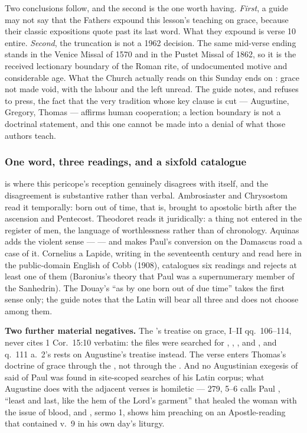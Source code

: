 Two conclusions follow, and the second is the one worth having. \textit{First},
a guide may not say that the Fathers expound this lesson's teaching on grace,
because their classic expositions quote past its last word. What they expound
is verse 10 entire. \textit{Second}, the truncation is not a 1962 decision.
The same mid-verse ending stands in the Venice Missal of 1570 and in the Pustet
Missal of 1862, so it is the received lectionary boundary of the Roman rite, of
undocumented motive and considerable age. What the Church actually reads on
this Sunday ends on : grace not made void,
with the labour and the  left unread. The guide notes, and refuses
to press, the fact that the very tradition whose key clause is cut ---
Augustine, Gregory, Thomas --- affirms human cooperation; a lection boundary is
not a doctrinal statement, and this one cannot be made into a denial of what
those authors teach.

\subsubsection*{One word, three readings, and a sixfold catalogue}

 is where this pericope's reception genuinely
disagrees with itself, and the disagreement is substantive rather than verbal.
Ambrosiaster and Chrysostom read it temporally: born out of time, that is,
brought to apostolic birth after the ascension and Pentecost. Theodoret reads
it juridically: a thing not entered in the register of men, the language of
worthlessness rather than of chronology. Aquinas adds the violent sense ---
 --- and makes Paul's conversion on the Damascus
road a case of it. Cornelius a Lapide, writing in the seventeenth century and
read here in the public-domain English of Cobb (1908), catalogues six readings
and rejects at least one of them (Baronius's theory that Paul was a
supernumerary member of the Sanhedrin). The Douay's ``as by one born out of due
time'' takes the first sense only; the guide notes that the Latin will bear all
three and does not choose among them.

\textbf{Two further material negatives.} The 's treatise
on grace, I--II qq.~106--114, never cites 1 Cor.~15:10 verbatim: the files were
searched for , ,
, and , and q.~111 a.~2's 
rests on Augustine's treatise instead. The verse enters Thomas's doctrine of
grace through the , not through the . And no
Augustinian exegesis of  said of Paul was found in
site-scoped searches of his Latin corpus; what Augustine does with the
adjacent verses is homiletic ---  279, 5--6 calls Paul
, ``least and last, like the hem of the Lord's garment'' that
healed the woman with the issue of blood, and , sermo
1, shows him preaching on an Apostle-reading that contained v.~9 in his own
day's liturgy.

